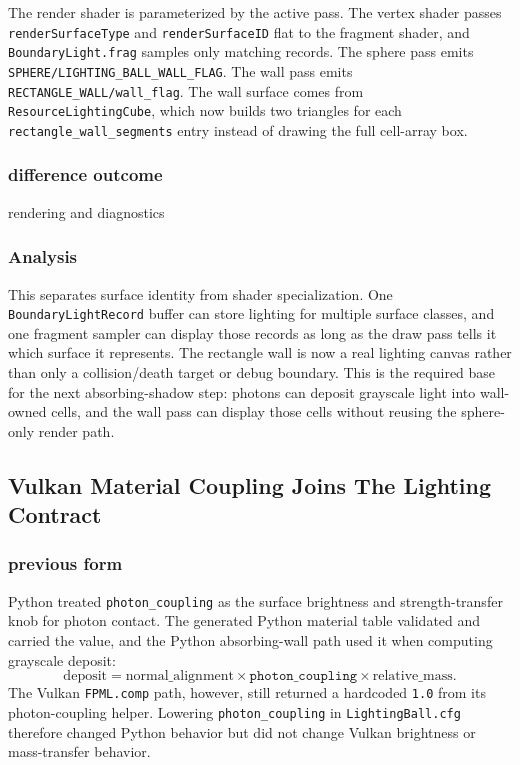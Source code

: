 The render shader is parameterized by the active pass.  The vertex shader
passes \texttt{renderSurfaceType} and \texttt{renderSurfaceID} flat to the
fragment shader, and \texttt{BoundaryLight.frag} samples only matching
records.  The sphere pass emits \texttt{SPHERE/LIGHTING\_BALL\_WALL\_FLAG}.
The wall pass emits \texttt{RECTANGLE\_WALL/wall\_flag}.  The wall surface
comes from \texttt{ResourceLightingCube}, which now builds two triangles for
each \texttt{rectangle\_wall\_segments} entry instead of drawing the full
cell-array box.

\subsubsection{difference outcome}

rendering and diagnostics

\subsubsection{Analysis}

This separates surface identity from shader specialization.  One
\texttt{BoundaryLightRecord} buffer can store lighting for multiple surface
classes, and one fragment sampler can display those records as long as the
draw pass tells it which surface it represents.  The rectangle wall is now a
real lighting canvas rather than only a collision/death target or debug
boundary.  This is the required base for the next absorbing-shadow step:
photons can deposit grayscale light into wall-owned cells, and the wall pass
can display those cells without reusing the sphere-only render path.

\subsection{Vulkan Material Coupling Joins The Lighting Contract}

\subsubsection{previous form}

Python treated \texttt{photon\_coupling} as the surface brightness and
strength-transfer knob for photon contact.  The generated Python material
table validated and carried the value, and the Python absorbing-wall path used
it when computing grayscale deposit:
\[
    \mathrm{deposit}
    =
    \mathrm{normal\_alignment}
    \times
    \texttt{photon\_coupling}
    \times
    \mathrm{relative\_mass}.
\]
The Vulkan \texttt{FPML.comp} path, however, still returned a hardcoded
\texttt{1.0} from its photon-coupling helper.  Lowering
\texttt{photon\_coupling} in \texttt{LightingBall.cfg} therefore changed
Python behavior but did not change Vulkan brightness or mass-transfer
behavior.

